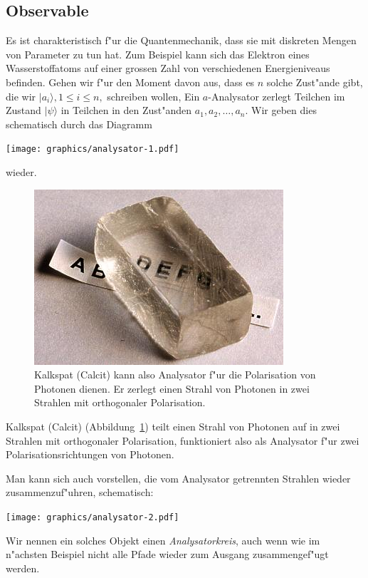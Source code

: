 \subsection{Observable}
%
Es ist charakteristisch f"ur die Quantenmechanik, dass sie mit diskreten
Mengen von Parameter zu tun hat. Zum Beispiel kann sich das Elektron eines
Wasserstoffatoms auf einer grossen Zahl von verschiedenen Energieniveaus
befinden. Gehen wir f"ur den Moment davon aus, dass es $n$ solche Zust"ande
gibt, die wir $|a_i\rangle, 1\le i\le n,$ schreiben wollen,
Ein $a$-Analysator zerlegt Teilchen im Zustand $|\psi\rangle$ in 
Teilchen in den Zust"anden $a_1,a_2,\dots,a_n$. Wir geben dies
schematisch durch das Diagramm
%
\begin{center}
\texttt{[image: graphics/analysator-1.pdf]}
\end{center}
wieder.
\begin{figure}
\centering
\includegraphics{images/calcit.jpg}
\caption{Kalkspat (Calcit) kann also Analysator f"ur die Polarisation
von Photonen dienen. Er zerlegt einen Strahl von Photonen in zwei
Strahlen mit orthogonaler Polarisation.
\label{skript:calcit}}
\end{figure}
%
%
%
Kalkspat (Calcit) (Abbildung~\ref{skript:calcit}) teilt einen Strahl
von Photonen auf in zwei Strahlen mit orthogonaler Polarisation,
funktioniert also als Analysator f"ur zwei Polarisationsrichtungen
von Photonen.

%
Man kann sich auch vorstellen, die vom Analysator getrennten Strahlen
wieder zusammenzuf"uhren, schematisch:
\begin{center}
\texttt{[image: graphics/analysator-2.pdf]}
\end{center}
Wir nennen ein solches Objekt einen {\em Analysatorkreis}, auch wenn wie
im n"achsten Beispiel nicht alle Pfade wieder zum Ausgang zusammengef"ugt
werden.


